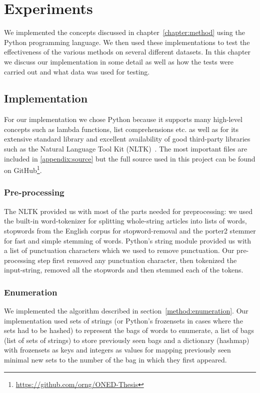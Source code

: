 \chapter{Experiments}
\label{chapter:experiments}

We implemented the concepts discussed in chapter~\ref{chapter:method} using the Python programming language. We then used these implementations to test the effectiveness of the various methods on several different datasets. In this chapter we discuss our implementation in some detail as well as how the tests were carried out and what data was used for testing.

\section{Implementation}
For our implementation we chose Python because it supports many high-level concepts such as lambda functions, list comprehensions etc. as well as for its extensive standard library and excellent availability of good third-party libraries such as the Natural Language Tool Kit (NLTK)~\cite{nltk}. The most important files are included in \cref{appendix:source} but the full source used in this project can be found on GitHub\footnote{\url{https://github.com/orng/ONED-Thesis}}.

\subsection{Pre-processing}
The NLTK provided us with most of the parts needed for preprocessing: we used the built-in word-tokenizer for splitting whole-string articles into lists of words,  stopwords from the English corpus for stopword-removal and the porter2 stemmer for fast and simple stemming of words. Python's string module provided us with a list of punctuation characters which we used to remove punctuation. Our pre-processing step first removed any punctuation character, then tokenized the input-string, removed all the stopwords and then stemmed each of the tokens.

\subsection{Enumeration}
We implemented the algorithm described in section~\ref{method:enumeration}. Our implementation used sets of strings (or Python's frozensets in cases where the sets had to be hashed) to represent the bags of words to enumerate, a list of bags (list of sets of strings) to store previously seen bags and a dictionary (hashmap) with frozensets as keys and integers as values for mapping previously seen minimal new sets to the number of the bag in which they first appeared. %

